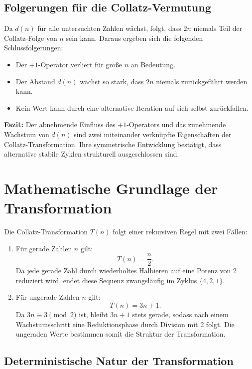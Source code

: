 \documentclass[a4paper,12pt]{article}
\begin{document}
\subsection{Folgerungen für die Collatz-Vermutung}

Da \( d(n) \) für alle untersuchten Zahlen wächst, folgt, dass \( 2n \) niemals Teil der Collatz-Folge von \( n \) sein kann. Daraus ergeben sich die folgenden Schlussfolgerungen:

\begin{itemize}
    \item Der \( +1 \)-Operator verliert für große \( n \) an Bedeutung.
    \item Der Abstand \( d(n) \) wächst so stark, dass \( 2n \) niemals zurückgeführt werden kann.
    \item Kein Wert kann durch eine alternative Iteration auf sich selbst zurückfallen.
\end{itemize}

\textbf{Fazit:} Der abnehmende Einfluss des \( +1 \)-Operators und das zunehmende Wachstum von \( d(n) \) sind zwei miteinander verknüpfte Eigenschaften der Collatz-Transformation. Ihre symmetrische Entwicklung bestätigt, dass alternative stabile Zyklen strukturell ausgeschlossen sind.





\section{Mathematische Grundlage der Transformation}

Die Collatz-Transformation \( T(n) \) folgt einer rekursiven Regel mit zwei Fällen:
\begin{enumerate}
    \item Für gerade Zahlen \( n \) gilt:
    \[
    T(n) = \frac{n}{2}.
    \]
    Da jede gerade Zahl durch wiederholtes Halbieren auf eine Potenz von 2 reduziert wird, endet diese Sequenz zwangsläufig im Zyklus \( \{4, 2, 1\} \).
    
    \item Für ungerade Zahlen \( n \) gilt:
    \[
    T(n) = 3n + 1.
    \]
    Da \( 3n \equiv 3 \pmod{2} \) ist, bleibt \( 3n+1 \) stets gerade, sodass nach einem Wachstumsschritt eine Reduktionsphase durch Division mit 2 folgt. Die ungeraden Werte bestimmen somit die Struktur der Transformation.
\end{enumerate}

\subsection{Deterministische Natur der Transformation}
\end{document}
